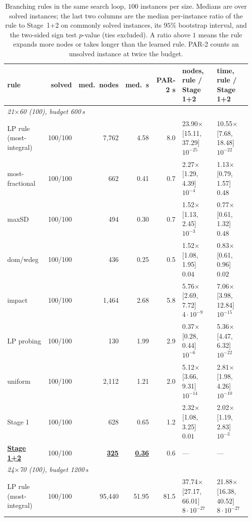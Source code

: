 \begin{table}[t]
\centering
\caption{Branching rules in the same search loop, $100$ instances per size. Medians are over solved instances; the last two columns are the median per-instance ratio of the rule to Stage~1+2 on commonly solved instances, its $95\%$ bootstrap interval, and the two-sided sign test $p$-value (ties excluded). A ratio above $1$ means the rule expands more nodes or takes longer than the learned rule. PAR-2 counts an unsolved instance at twice the budget.}
\label{tab:rq1}
\footnotesize
\begin{tabular}{lrrrrll}
\toprule
rule & solved & med.\ nodes & med.\ s & PAR-2 s & nodes, rule / Stage 1+2 & time, rule / Stage 1+2 \\
\midrule
\multicolumn{7}{l}{\emph{21$\times$60 (100), budget 600\,s}} \\
LP rule (most-integral) & 100/100 & 7,762 & 4.58 & 8.0 & 23.90$\times$ [15.11, 37.29] $10^{-25}$ & 10.55$\times$ [7.68, 18.48] $10^{-22}$ \\
most-fractional & 100/100 & 662 & 0.41 & 0.7 & 2.27$\times$ [1.29, 4.39] $10^{-4}$ & 1.13$\times$ [0.79, 1.57] $0.48$ \\
maxSD & 100/100 & 494 & 0.30 & 0.7 & 1.52$\times$ [1.13, 2.45] $10^{-3}$ & 0.77$\times$ [0.61, 1.32] $0.48$ \\
dom/wdeg & 100/100 & 436 & 0.25 & 0.5 & 1.52$\times$ [1.08, 1.95] $0.04$ & 0.83$\times$ [0.61, 0.96] $0.02$ \\
impact & 100/100 & 1,464 & 2.68 & 5.8 & 5.76$\times$ [2.69, 7.72] $4\cdot10^{-9}$ & 7.06$\times$ [3.98, 12.84] $10^{-15}$ \\
LP probing & 100/100 & 130 & 1.99 & 2.9 & 0.37$\times$ [0.28, 0.44] $10^{-6}$ & 5.36$\times$ [4.47, 6.32] $10^{-22}$ \\
uniform & 100/100 & 2,112 & 1.21 & 2.0 & 5.12$\times$ [3.66, 9.31] $10^{-14}$ & 2.81$\times$ [1.98, 4.26] $10^{-10}$ \\
Stage 1 & 100/100 & 628 & 0.65 & 1.2 & 2.32$\times$ [1.08, 3.25] $0.01$ & 2.02$\times$ [1.19, 2.83] $10^{-3}$ \\
\textbf{\underline{Stage 1+2}} & 100/100 & \textbf{\underline{325}} & \textbf{\underline{0.36}} & 0.6 & --- & --- \\
\midrule
\multicolumn{7}{l}{\emph{24$\times$70 (100), budget 1200\,s}} \\
LP rule (most-integral) & 100/100 & 95,440 & 51.95 & 81.5 & 37.74$\times$ [27.17, 66.01] $8\cdot10^{-27}$ & 21.88$\times$ [16.38, 40.52] $8\cdot10^{-27}$ \\

\end{tabular}
\end{table}
